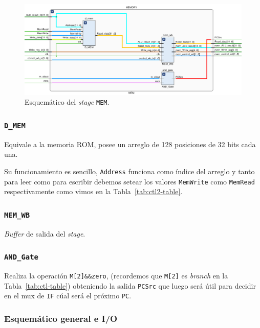 \documentclass[a4paper]{article}
\begin{document}
\begin{figure}[H]
	\begin{center}				
	\includegraphics[width=1.5\textwidth,center]{TP4_13.png}
  	\caption{Esquemático del \textit{stage} \texttt{MEM}.}
  	\label{fig:funcionamiento.}
  	\end{center}
\end{figure}

\subsubsection{\texttt{D\_MEM}}
Equivale a la memoria ROM, posee un arreglo de 128 posiciones de 32 bits cada una.

Su funcionamiento es sencillo, \texttt{Address} funciona como índice del arreglo y tanto para leer como para escribir debemos setear los valores \texttt{MemWrite} como \texttt{MemRead} respectivamente como vimos en la Tabla~\ref{tab:ctl2-table}.

\subsubsection{\texttt{MEM\_WB}}
\textit{Buffer} de salida del \textit{stage}.

\subsubsection{\texttt{AND\_Gate}}
Realiza la operación \texttt{M[2]\&\&zero}, (recordemos que \texttt{M[2]} es \textit{branch} en la Tabla~\ref{tab:ctl-table}) obteniendo la salida \texttt{PCSrc} que luego será útil para decidir en el mux de \texttt{IF} cúal será el próximo \texttt{PC}.

\subsubsection{Esquemático general e I/O}
\end{document}
